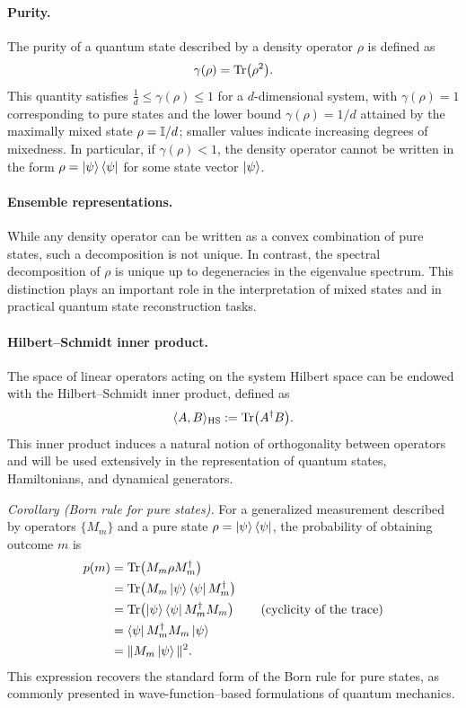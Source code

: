 \paragraph{Purity.}
The purity of a quantum state described by a density operator $\rho$ is defined as
\begin{equation}
    \gamma(\rho) = \Tr(\rho^2).
\end{equation}
This quantity satisfies $\frac{1}{d} \le \gamma(\rho) \leq 1$ for a $d$-dimensional system, with $\gamma(\rho) = 1$ corresponding to pure states and the lower bound $\gamma(\rho)=1/d$ attained by the maximally mixed state $\rho = \mathbb{I}/d$; smaller values indicate increasing degrees of mixedness. In particular, if $\gamma(\rho) < 1$, the density operator cannot be written in the form $\rho = \ket{\psi}\bra{\psi}$ for some state vector $\ket{\psi}$.

\paragraph{Ensemble representations.}
While any density operator can be written as a convex combination of pure states, such a decomposition is not unique. In contrast, the spectral decomposition of $\rho$ is unique up to degeneracies in the eigenvalue spectrum. This distinction plays an important role in the interpretation of mixed states and in practical quantum state reconstruction tasks.

\paragraph{Hilbert--Schmidt inner product.}
The space of linear operators acting on the system Hilbert space can be endowed with the Hilbert--Schmidt inner product, defined as
\begin{equation}
    \langle A, B \rangle_{\mathrm{HS}} := \Tr(A^{\dagger} B).
\end{equation}
This inner product induces a natural notion of orthogonality between operators and will be used extensively in the representation of quantum states, Hamiltonians, and dynamical generators.

\textit{Corollary (Born rule for pure states).}
For a generalized measurement described by operators $\{M_m\}$ and a pure state $\rho=\ket{\psi}\bra{\psi}$, the probability of obtaining outcome $m$ is
\begin{align}
    p(m) & = \Tr\!\left(M_m \rho M_m^{\dagger}\right) \nonumber                 \\
         & = \Tr\!\left(M_m \ket{\psi}\bra{\psi} M_m^{\dagger}\right) \nonumber \\
         & = \Tr\!\left(\ket{\psi}\bra{\psi} M_m^{\dagger} M_m\right)
    \qquad (\text{cyclicity of the trace}) \nonumber                            \\
         & = \bra{\psi} M_m^{\dagger} M_m \ket{\psi} \nonumber                  \\
         & = \|M_m\ket{\psi}\|^2.
\end{align}
This expression recovers the standard form of the Born rule for pure states, as commonly presented in wave-function–based formulations of quantum mechanics.


